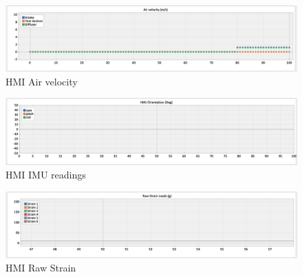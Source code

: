 \begin{center}
	\begin{figure}[H]
		\centering
		\includegraphics[width=1\linewidth]{Figures/Screenshot 2022-12-11 194826.png}
		\caption[HMI Air velocity]{HMI Air velocity}
	\end{figure}
\end{center}
\begin{center}
	\begin{figure}[H]
		\centering
		\includegraphics[width=1\linewidth]{Figures/Screenshot 2022-12-11 194952.png}
		\caption[HMI IMU readings]{HMI IMU readings}
	\end{figure}
\end{center}
\begin{center}
	\begin{figure}[H]
		\centering
		\includegraphics[width=1\linewidth]{Figures/Screenshot 2022-12-11 194931.png}
		\caption[HMI Raw Strain]{HMI Raw Strain}
	\end{figure}
\end{center}
